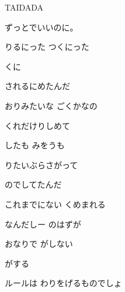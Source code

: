 \documentclass[a4paper,tate,twocolumn,12pt]{ltjtarticle}
\begin{document}
\thispagestyle{empty}

\begin{center}
{\LARGE TAIDADA}

{\large ずっとでいいのに。}
\end{center}

\vspace{1em}

\begin{flushleft}

\noindent\begin{minipage}{\linewidth}
りるにった つくにった

くに

されるにめたんだ

おりみたいな ごくかなの

くれだけりしめて
\end{minipage}

\vspace{2em}

\noindent\begin{minipage}{\linewidth}
したも みをうも

りたいぶらさがって

のでしてたんだ

これまでにない くめまれる
\end{minipage}

\vspace{2em}

\noindent\begin{minipage}{\linewidth}
なんだしー のはずが

おなりで がしない

 がする

ルールは わりをげるものでしょ
\end{minipage}


\end{flushleft}
\end{document}
